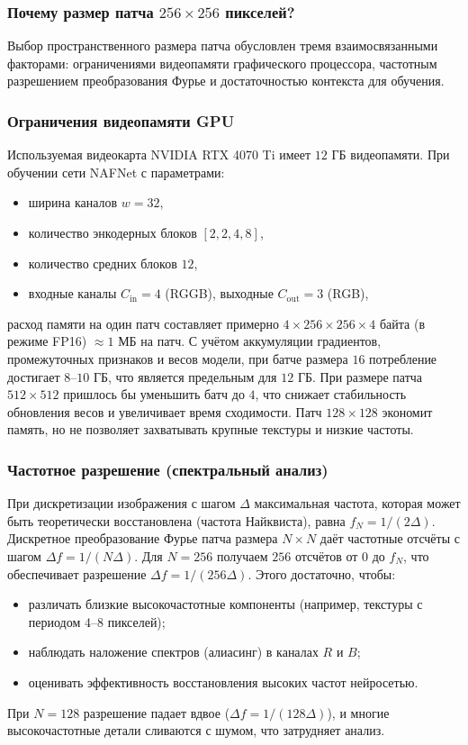 \documentclass[12pt,a4paper]{article}
\begin{document}
\subsubsection{Почему размер патча $256\times256$ пикселей?}
Выбор пространственного размера патча обусловлен тремя взаимосвязанными факторами: ограничениями видеопамяти графического процессора, частотным разрешением преобразования Фурье и достаточностью контекста для обучения.

\subsubsection{Ограничения видеопамяти GPU}
Используемая видеокарта NVIDIA RTX 4070 Ti имеет $12$ ГБ видеопамяти. При обучении сети NAFNet с параметрами:
\begin{itemize}
    \item ширина каналов $w = 32$,
    \item количество энкодерных блоков $[2,2,4,8]$,
    \item количество средних блоков $12$,
    \item входные каналы $C_{\text{in}} = 4$ (RGGB), выходные $C_{\text{out}} = 3$ (RGB),
\end{itemize}
расход памяти на один патч составляет примерно $4 \times 256 \times 256 \times 4$ байта (в режиме FP16) $\approx 1$ МБ на патч. С учётом аккумуляции градиентов, промежуточных признаков и весов модели, при батче размера $16$ потребление достигает $8$–$10$ ГБ, что является предельным для $12$ ГБ. При размере патча $512\times512$ пришлось бы уменьшить батч до $4$, что снижает стабильность обновления весов и увеличивает время сходимости. Патч $128\times128$ экономит память, но не позволяет захватывать крупные текстуры и низкие частоты.

\subsubsection{Частотное разрешение (спектральный анализ)}
При дискретизации изображения с шагом $\Delta$ максимальная частота, которая может быть теоретически восстановлена (частота Найквиста), равна $f_N = 1/(2\Delta)$. Дискретное преобразование Фурье патча размера $N\times N$ даёт частотные отсчёты с шагом $\Delta f = 1/(N\Delta)$. Для $N=256$ получаем $256$ отсчётов от $0$ до $f_N$, что обеспечивает разрешение $\Delta f = 1/(256\Delta)$. Этого достаточно, чтобы:
\begin{itemize}
    \item различать близкие высокочастотные компоненты (например, текстуры с периодом $4$–$8$ пикселей);
    \item наблюдать наложение спектров (алиасинг) в каналах $R$ и $B$;
    \item оценивать эффективность восстановления высоких частот нейросетью.
\end{itemize}
При $N=128$ разрешение падает вдвое ($\Delta f = 1/(128\Delta)$), и многие высокочастотные детали сливаются с шумом, что затрудняет анализ.
\end{document}
